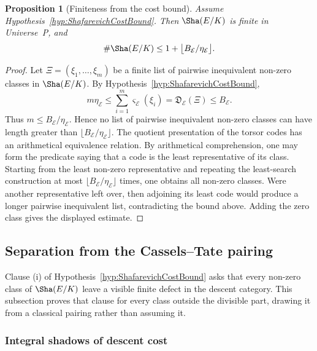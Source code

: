 \documentclass[10pt, reqno]{amsart}
\theoremstyle{plain}
\newtheorem{proposition}[theorem]{Proposition}
\theoremstyle{definition}
\theoremstyle{plain}
\begin{document}
\begin{proposition}[Finiteness from the cost bound]
\label{prop:CostBoundFinitenessSha}
Assume Hypothesis~\ref{hyp:ShafarevichCostBound}. Then $\Sha(E/K)$ is finite in Universe~P, and
\[
  \#\Sha(E/K)
  \le
  1+\bigl\lfloor B_{\mathcal{E}}/\eta_{\mathcal{E}}\bigr\rfloor.
\]
\end{proposition}

\begin{proof}
Let $\Xi=(\xi_{1},\ldots,\xi_{m})$ be a finite list of pairwise inequivalent non-zero classes in $\Sha(E/K)$. By Hypothesis~\ref{hyp:ShafarevichCostBound},
\[
  m\eta_{\mathcal{E}}
  \le
  \sum_{i=1}^{m}\varsigma_{\mathcal{E}}(\xi_i)
  =
  \mathfrak{D}_{\mathcal{E}}(\Xi)
  \le
  B_{\mathcal{E}}.
\]
Thus $m\le B_{\mathcal{E}}/\eta_{\mathcal{E}}$. Hence no list of pairwise inequivalent non-zero classes can have length greater than $\lfloor B_{\mathcal{E}}/\eta_{\mathcal{E}}\rfloor$. The quotient presentation of the torsor codes has an arithmetical equivalence relation. By arithmetical comprehension, one may form the predicate saying that a code is the least representative of its class. Starting from the least non-zero representative and repeating the least-search construction at most $\lfloor B_{\mathcal{E}}/\eta_{\mathcal{E}}\rfloor$ times, one obtains all non-zero classes. Were another representative left over, then adjoining its least code would produce a longer pairwise inequivalent list, contradicting the bound above. Adding the zero class gives the displayed estimate.
\end{proof}
\subsection{Separation from the Cassels--Tate pairing}
\label{subsec:TowardShafarevichCostBound}

Clause (i) of Hypothesis~\ref{hyp:ShafarevichCostBound} asks that every non-zero class of $\Sha(E/K)$ leave a visible finite defect in the descent category. This subsection proves that clause for every class outside the divisible part, drawing it from a classical pairing rather than assuming it.

\subsubsection{Integral shadows of descent cost}
\label{subsubsec:IntegralDescentShadow}
\end{document}
